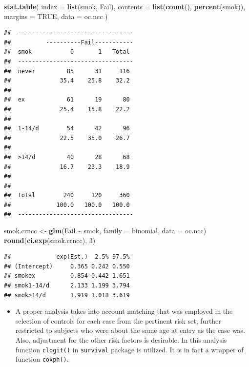 \documentclass[
]{book}
\newenvironment{Shaded}{\begin{snugshade}}{\end{snugshade}}
\newcommand{\AttributeTok}[1]{\textcolor[rgb]{0.13,0.29,0.53}{#1}}
\newcommand{\ConstantTok}[1]{\textcolor[rgb]{0.56,0.35,0.01}{#1}}
\newcommand{\DecValTok}[1]{\textcolor[rgb]{0.00,0.00,0.81}{#1}}
\newcommand{\FunctionTok}[1]{\textcolor[rgb]{0.13,0.29,0.53}{\textbf{#1}}}
\newcommand{\NormalTok}[1]{#1}
\newcommand{\OtherTok}[1]{\textcolor[rgb]{0.56,0.35,0.01}{#1}}
\newcommand{\SpecialCharTok}[1]{\textcolor[rgb]{0.81,0.36,0.00}{\textbf{#1}}}
\providecommand{\tightlist}{%
  \setlength{\itemsep}{0pt}\setlength{\parskip}{0pt}}
\begin{document}
\begin{Shaded}
\begin{Highlighting}[]
\FunctionTok{stat.table}\NormalTok{(}
  \AttributeTok{index =} \FunctionTok{list}\NormalTok{(smok, Fail),}
  \AttributeTok{contents =} \FunctionTok{list}\NormalTok{(}\FunctionTok{count}\NormalTok{(), }\FunctionTok{percent}\NormalTok{(smok)),}
  \AttributeTok{margins =} \ConstantTok{TRUE}\NormalTok{, }
  \AttributeTok{data =}\NormalTok{ oc.ncc}
\NormalTok{)}
\end{Highlighting}
\end{Shaded}

\begin{verbatim}
##  --------------------------------- 
##          ----------Fail----------- 
##  smok           0       1   Total  
##  --------------------------------- 
##  never         85      31     116  
##              35.4    25.8    32.2  
##                                    
##  ex            61      19      80  
##              25.4    15.8    22.2  
##                                    
##  1-14/d        54      42      96  
##              22.5    35.0    26.7  
##                                    
##  >14/d         40      28      68  
##              16.7    23.3    18.9  
##                                    
##                                    
##  Total        240     120     360  
##             100.0   100.0   100.0  
##  ---------------------------------
\end{verbatim}

\begin{Shaded}
\begin{Highlighting}[]
\NormalTok{smok.crncc }\OtherTok{\textless{}{-}} \FunctionTok{glm}\NormalTok{(Fail }\SpecialCharTok{\textasciitilde{}}\NormalTok{ smok, }\AttributeTok{family =}\NormalTok{ binomial, }\AttributeTok{data =}\NormalTok{ oc.ncc)}
\FunctionTok{round}\NormalTok{(}\FunctionTok{ci.exp}\NormalTok{(smok.crncc), }\DecValTok{3}\NormalTok{)}
\end{Highlighting}
\end{Shaded}

\begin{verbatim}
##             exp(Est.)  2.5% 97.5%
## (Intercept)     0.365 0.242 0.550
## smokex          0.854 0.442 1.651
## smok1-14/d      2.133 1.199 3.794
## smok>14/d       1.919 1.018 3.619
\end{verbatim}

\begin{itemize}
\tightlist
\item
  A proper analysis takes into account matching that was employed
  in the selection of controls for each case from the
  pertinent risk set, further restricted to
  subjects who were about the same age at entry as the case was.
  Also, adjustment for the other risk factors is desirable.
  In this analysis function \texttt{clogit()} in \texttt{survival} package is
  utilized. It is in fact a wrapper of function \texttt{coxph()}.
\end{itemize}
\end{document}
